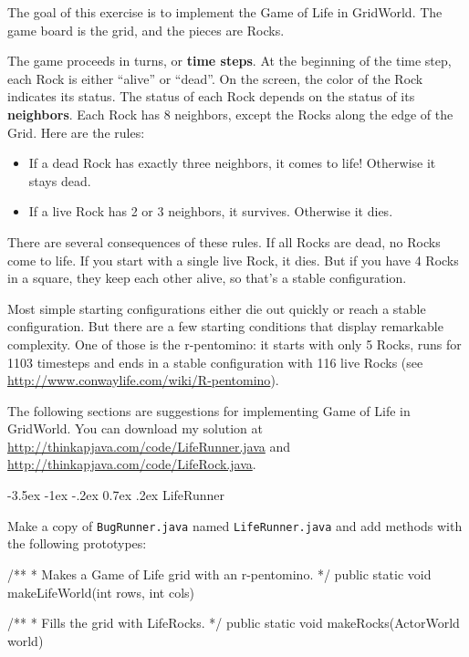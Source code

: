 \documentclass[12pt]{book}
\makeatletter
\renewcommand{\section}{\@startsection {section}{1}{\z@}%
    {-3.5ex \@plus -1ex \@minus -.2ex}%
    {0.7ex \@plus.2ex}%
    {\normalfont\Large\bfseries}}
\theoremstyle{exercise}
\newcommand{\java}[1]{\lstinline{#1}} %
\makeatother
\begin{document}
The goal of this exercise is to implement the Game of Life in GridWorld.
The game board is the grid, and the pieces are Rocks.

The game proceeds in turns, or {\bf time steps}.
At the beginning of the time step, each Rock is either ``alive'' or ``dead''.
On the screen, the color of the Rock indicates its status.
%
The status of each Rock depends on the status of its {\bf neighbors}.
Each Rock has 8 neighbors, except the Rocks along the edge of the Grid.
Here are the rules:

\begin{itemize}

\item If a dead Rock has exactly three neighbors, it comes to life!
Otherwise it stays dead.

\item If a live Rock has 2 or 3 neighbors, it survives.
Otherwise it dies.

\end{itemize}

There are several consequences of these rules.
If all Rocks are dead, no Rocks come to life.
If you start with a single live Rock, it dies.
But if you have 4 Rocks in a square, they keep each other alive, so that's a stable configuration.

Most simple starting configurations either die out quickly or reach a stable configuration.
But there are a few starting conditions that display remarkable complexity.
One of those is the r-pentomino: it starts with only 5 Rocks, runs for 1103 timesteps and ends in a stable configuration with 116 live Rocks (see \url{http://www.conwaylife.com/wiki/R-pentomino}).

The following sections are suggestions for implementing Game of Life in GridWorld.
You can download my solution at \url{http://thinkapjava.com/code/LifeRunner.java} and \url{http://thinkapjava.com/code/LifeRock.java}.


\section{LifeRunner}

Make a copy of \java{BugRunner.java} named \java{LifeRunner.java} and add methods with the following prototypes:

\begin{code}
    /**
     * Makes a Game of Life grid with an r-pentomino.
     */
    public static void makeLifeWorld(int rows, int cols)

    /**
     * Fills the grid with LifeRocks.
     */
    public static void makeRocks(ActorWorld world)
\end{code}
\end{document}
